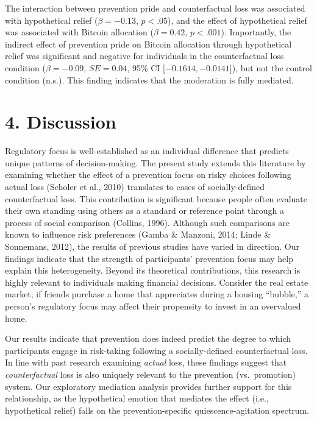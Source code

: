 \documentclass[man,floatsintext]{apa6}
\begin{document}
The interaction between prevention pride and counterfactual loss was associated with hypothetical relief (\(\beta=-0.13\), \(p<.05\)), and the effect of hypothetical relief was associated with Bitcoin allocation (\(\beta=0.42\), \(p<.001\)). Importantly, the indirect effect of prevention pride on Bitcoin allocation through hypothetical relief was significant and negative for individuals in the counterfactual loss condition (\(\beta=-0.09\), \(SE=0.04\), 95\% CI {[}\(-0.1614, -0.0141\){]}), but not the control condition (n.s.). This finding indicates that the moderation is fully mediated.

\hypertarget{discussion}{%
\section{4. Discussion}\label{discussion}}

Regulatory focus is well-established as an individual difference that predicts unique patterns of decision-making. The present study extends this literature by examining whether the effect of a prevention focus on risky choices following actual loss (Scholer et al., 2010) translates to cases of socially-defined counterfactual loss. This contribution is significant because people often evaluate their own standing using others as a standard or reference point through a process of social comparison (Collins, 1996). Although such comparisons are known to influence risk preferences (Gamba \& Manzoni, 2014; Linde \& Sonnemans, 2012), the results of previous studies have varied in direction. Our findings indicate that the strength of participants' prevention focus may help explain this heterogeneity. Beyond its theoretical contributions, this research is highly relevant to individuals making financial decisions. Consider the real estate market; if friends purchase a home that appreciates during a housing \enquote{bubble,} a person's regulatory focus may affect their propensity to invest in an overvalued home.

Our results indicate that prevention does indeed predict the degree to which participants engage in risk-taking following a socially-defined counterfactual loss. In line with past research examining \emph{actual} loss, these findings suggest that \emph{counterfactual} loss is also uniquely relevant to the prevention (vs.~promotion) system. Our exploratory mediation analysis provides further support for this relationship, as the hypothetical emotion that mediates the effect (i.e., hypothetical relief) falls on the prevention-specific quiescence-agitation spectrum.
\end{document}
